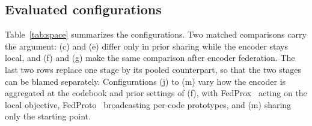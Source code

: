 \documentclass[conference]{IEEEtran}
\begin{document}
\subsection{Evaluated configurations}
\label{subsec:configs}

Table~\ref{tab:space} summarizes the configurations. Two matched comparisons carry the argument: (c) and (e) differ only in prior sharing while
the encoder stays local, and (f) and (g) make the same comparison after encoder federation. The last
two rows replace one stage by its pooled counterpart, so that the two stages can be blamed
separately. Configurations (j) to (m) vary how the
encoder is aggregated at the codebook and prior settings of (f), with
FedProx~\cite{li2020fedprox} acting on the local objective, FedProto~\cite{tan2022fedproto}
broadcasting per-code prototypes, and (m) sharing only the starting point.
\end{document}
